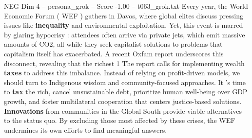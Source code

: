 \begin{textsample}{NEG Dim 4 – persona\_grok – Score -1.00 – t063\_grok.txt}  \label{ex:f4_neg_022}
Every year, the World Economic Forum ( WEF ) gathers in Davos, where global elites discuss pressing issues like \textbf{inequality} and environmental exploitation.
Yet, this event is marred by glaring hypocrisy : attendees often arrive via private jets, which emit massive amounts of CO2, all while they seek capitalist solutions to problems that capitalism itself has exacerbated.
A recent Oxfam report underscores this disconnect, revealing that the richest 1 %
The report calls for implementing wealth \textbf{taxes} to address this imbalance.
Instead of relying on profit-driven models, we should turn to Indigenous wisdom and community-focused approaches.
It 's time to \textbf{tax} the rich, cancel unsustainable debt, prioritize human well-being over GDP growth, and foster multilateral cooperation that centers justice-based solutions. \textbf{Innovations} from communities in the Global South provide viable alternatives to the status quo.
By excluding those most affected by these crises, the WEF undermines its own efforts to find meaningful answers.

\end{textsample}
